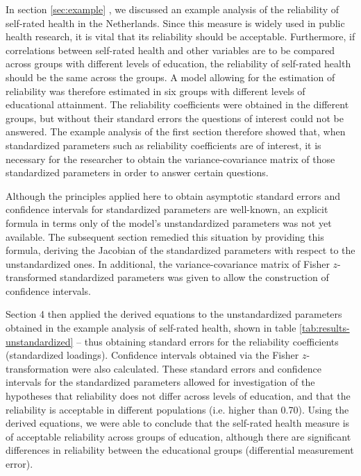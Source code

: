 \documentclass[a4paper,11pt]{article}
\newcommand{\0}{\boldsymbol{0}}
\begin{document}
In section \ref{sec:example} , we discussed an example analysis of the reliability of self-rated health in the Netherlands. Since this measure is widely used in 
 public health research, it is vital that its reliability should be acceptable. Furthermore, if correlations between self-rated health and 
 other variables are to be compared across groups with different levels of education, the reliability of self-rated health should be the 
 same across the groups. A model allowing for the estimation of reliability was therefore estimated in six groups with different levels
 of educational attainment. The reliability coefficients were obtained in the different groups, but without their standard errors the questions
 of interest could not be answered.
The example analysis of the first section therefore showed that, when standardized parameters such as reliability coefficients are of interest, it is necessary for the researcher to obtain the variance-covariance matrix of those standardized parameters in order to answer certain questions.

Although the principles applied here to obtain asymptotic standard errors and confidence intervals for standardized parameters are well-known, 
an explicit formula in terms only of the model's unstandardized parameters was not yet available. The subsequent section remedied this situation by providing this formula, deriving the Jacobian of the standardized parameters with respect to the unstandardized ones. In additional, the 
variance-covariance matrix of Fisher $z$-transformed standardized parameters was given to allow the construction of confidence intervals.

Section 4 then applied the derived equations to the unstandardized parameters obtained in the example analysis of self-rated health, shown in table \ref{tab:results-unstandardized} -- thus obtaining standard errors for the reliability coefficients (standardized loadings). Confidence intervals obtained via the Fisher $z$-transformation were also calculated. These standard errors and confidence intervals for the standardized parameters allowed for 
investigation of the hypotheses that reliability does not differ across levels of education, and that the reliability is acceptable in 
different populations (i.e. higher than 0.70). Using the derived equations, we were able to conclude that the self-rated health measure
is of acceptable reliability across groups of education, although there are significant differences in reliability between the educational groups (differential measurement error).
\end{document}

